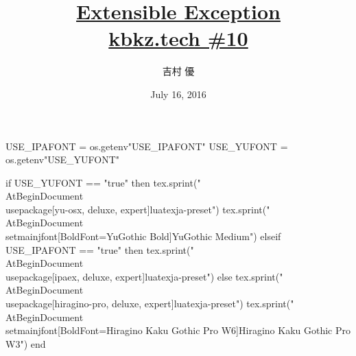 \hypersetup{colorlinks,linkcolor=,urlcolor=links}

\beamertemplatenavigationsymbolsempty

\usepackage{luacode}
\usepackage{luatexja}
\usepackage{pgfpages}
\usepackage[osf]{mathpazo}

\begin{luacode*}
  USE_IPAFONT = os.getenv"USE_IPAFONT"
  USE_YUFONT = os.getenv"USE_YUFONT"
  
  if USE_YUFONT == "true" then
    tex.sprint("\\AtBeginDocument{\\usepackage[yu-osx, deluxe, expert]{luatexja-preset}}")
    tex.sprint("\\AtBeginDocument{\\setmainjfont[BoldFont=YuGothic Bold]{YuGothic Medium}}")
  elseif USE_IPAFONT == "true" then
    tex.sprint("\\AtBeginDocument{\\usepackage[ipaex, deluxe, expert]{luatexja-preset}}")
  else
    tex.sprint("\\AtBeginDocument{\\usepackage[hiragino-pro, deluxe, expert]{luatexja-preset}}")
    tex.sprint("\\AtBeginDocument{\\setmainjfont[BoldFont=Hiragino Kaku Gothic Pro W6]{Hiragino Kaku Gothic Pro W3}}")
  end
\end{luacode*}

\usepackage{epigraph}
\usepackage{etoolbox}
\usepackage{tikz}
\usepackage{framed}
\usepackage{libertine}
\usepackage[final]{listings}
\usepackage{amsmath}
\usepackage{mathtools}



\setmainfont[Numbers=OldStyle, BoldFont=Palatino Bold]{Palatino}
\setsansfont{CMU Sans Serif}
\setmonofont{CMU Typewriter Text}

\title[Extensible Exception]{%
  \href{https://github.com/y-yu/extensible-exception-slide}{Extensible Exception} \\
  \href{http://kbkz.connpass.com/event/32420/}{\normalsize kbkz.tech \#10}
}
\author{吉村 優}
\date{July 16, 2016}

